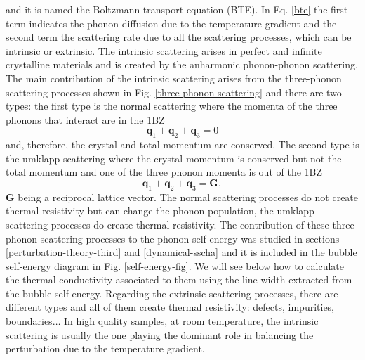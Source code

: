 and it is named the Boltzmann transport equation (BTE). In Eq. \ref{bte} the first term indicates the phonon diffusion due to the temperature gradient and the second term the scattering rate due to all the scattering 
processes, which can be intrinsic or extrinsic. The intrinsic scattering arises in perfect and infinite crystalline materials and is created by the anharmonic phonon-phonon scattering. The main contribution of 
the intrinsic scattering arises from the three-phonon scattering processes shown in Fig. \ref{three-phonon-scattering} and there are two types: the first type is the normal scattering where the momenta of the three 
phonons that interact are in the 1BZ
\begin{equation}
\mathbf{q}_{1}+\mathbf{q}_{2}+\mathbf{q}_{3}=0
\end{equation} 
and, therefore, the crystal and total momentum are conserved. The second type is the umklapp scattering where the crystal momentum is conserved but not the total momentum and one of the three phonon momenta is out of the 1BZ
\begin{equation}
\mathbf{q}_{1}+\mathbf{q}_{2}+\mathbf{q}_{3}=\mathbf{G},
\end{equation}
$\mathbf{G}$ being a reciprocal lattice vector. The normal scattering processes do not create thermal resistivity but can change the phonon population\cite{callaway1959model,tritt2005thermal}, the umklapp scattering 
processes do create thermal resistivity. The contribution of these three phonon scattering processes to the phonon self-energy was studied in sections \ref{perturbation-theory-third} and \ref{dynamical-sscha} and it is 
included in the bubble self-energy diagram in Fig. \ref{self-energy-fig}. We will see below how to calculate the thermal conductivity associated to them using the line width extracted from the bubble self-energy. Regarding the 
extrinsic scattering processes, there are different types and all of them create thermal resistivity: defects, impurities, boundaries$\dots$ In high quality samples, at room temperature, the intrinsic scattering is usually the 
one playing the dominant role in balancing the perturbation due to the temperature gradient. \\

